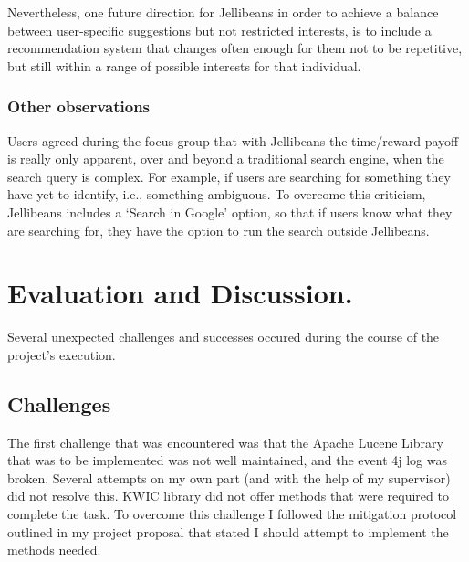 \documentclass[a4paper, 11pt]{article}
\begin{document}
\vspace{5mm}
Nevertheless, one future direction for Jellibeans in order to achieve a balance between user-specific suggestions but not restricted interests, is to include a recommendation system that changes often enough for them not to be repetitive, but still within a range of possible interests for that individual. 

\subsubsection{Other observations}

Users agreed during the focus group that with Jellibeans the time/reward payoff is really only apparent, over and beyond a traditional search engine, when the search query is complex. For example, if users are searching for something they have yet to identify, i.e., something ambiguous. To overcome this criticism, Jellibeans includes a `Search in Google' option, so that if users know what they are searching for, they have the option to run the search outside Jellibeans.

\section{Evaluation and Discussion.}\label{eval}

Several unexpected challenges and successes occured during the course of the project's execution.  

\subsection {Challenges}
The first challenge that was encountered was that the Apache Lucene Library that was to be implemented was not well maintained, and the event 4j log was broken. Several attempts on my own part (and with the help of my supervisor) did not resolve this. KWIC library did not offer methods that were required to complete the task. To overcome this challenge I followed the mitigation protocol outlined in my project proposal that stated I should attempt to implement the methods needed. 
\end{document}

